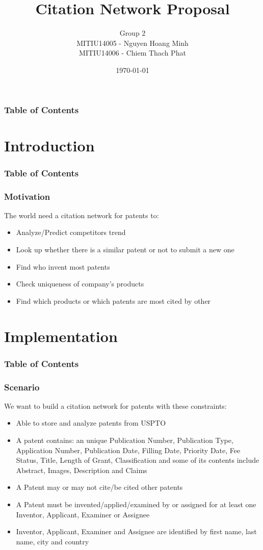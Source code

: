 \documentclass{beamer}
\title[Citation Network Proposal]{Citation Network Proposal}
\author[Group 2 - ADB Course]{Group 2\\MITIU14005 - Nguyen Hoang Minh \\ MITIU14006 - Chiem Thach Phat}
\institute[HCMIU]{Ho Chi Minh City, International University}
\date{\today}
\begin{document}
\begin{frame}
\titlepage
\end{frame}

\begin{frame}
\frametitle{Table of Contents}
\tableofcontents
\end{frame}
\section{Introduction}
\begin{frame}
\frametitle{Table of Contents}
\tableofcontents[currentsection]
\end{frame}

\begin{frame}
\frametitle{Motivation}
The world need a citation network for patents to:
\begin{itemize}
\item Analyze/Predict competitors trend
\item Look up whether there is a similar patent or not to submit a new one
\item Find who invent most patents
\item Check uniqueness of company's products
\item Find which products or which patents are most cited by other
\end{itemize}
\end{frame}

\section{Implementation}
\begin{frame}
\frametitle{Table of Contents}
\tableofcontents[currentsection]
\end{frame}

\begin{frame}
\frametitle{Scenario}
We want to build a citation network for patents with these constraints:
\begin{itemize}
\item Able to store and analyze patents from USPTO
\item A patent contains: an unique Publication Number, Publication Type, Application Number, Publication Date, Filling Date, Priority Date, Fee Status, Title, Length of Grant, Classification and some of its contents include Abstract, Images, Description and Claims
\item A Patent may or may not cite/be cited other patents
\item A Patent must be invented/applied/examined by or assigned for at least one Inventor, Applicant, Examiner or Assignee
\item Inventor, Applicant, Examiner and Assignee are identified by first name, last name, city and country
\end{itemize}
\end{frame}
\end{document}
